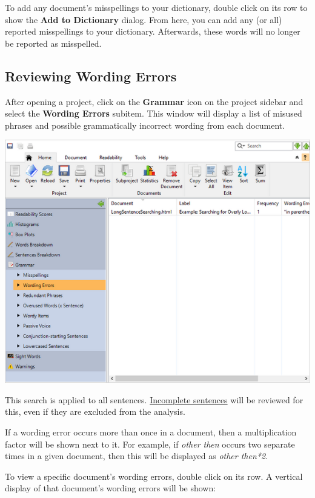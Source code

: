 \documentclass[
]{book}
\theoremstyle{definition}
\theoremstyle{definition}
\theoremstyle{definition}
\theoremstyle{definition}
\theoremstyle{remark}
\begin{document}
To add any document's misspellings to your dictionary, double click on its row to show the \textbf{Add to Dictionary} dialog. From here, you can add any (or all) reported misspellings to your dictionary. Afterwards, these words will no longer be reported as misspelled.

\hypertarget{reviewing-batch-wording-errors}{%
\subsection*{Reviewing Wording Errors}\label{reviewing-batch-wording-errors}}

After opening a project, click on the \textbf{Grammar} icon on the project sidebar and select the \textbf{Wording Errors} subitem. This window will display a list of misused phrases and possible grammatically incorrect wording from each document.

\includegraphics{Images/batchwordingerrors.png}

This search is applied to all sentences. \protect\hyperlink{how-text-is-excluded}{Incomplete sentences} will be reviewed for this, even if they are excluded from the analysis.

If a wording error occurs more than once in a document, then a multiplication factor will be shown next to it. For example, if \emph{other then} occurs two separate times in a given document, then this will be displayed as \emph{other then*2}.

To view a specific document's wording errors, double click on its row. A vertical display of that document's wording errors will be shown:
\end{document}
